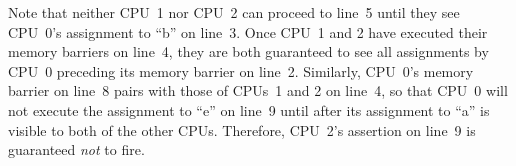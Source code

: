 \begin{table*}
\scriptsize
{}
\caption{Memory Barrier Example 3}
\label{tab:app:whymb:Memory Barrier Example 3}
\end{table*}

Note that neither CPU~1 nor CPU~2 can proceed to line~5 until they see
CPU~0's assignment to ``b'' on line~3.
Once CPU~1 and 2 have executed their memory barriers on line~4, they
are both guaranteed to see all assignments by CPU~0 preceding its memory
barrier on line~2.
Similarly, CPU~0's memory barrier on line~8 pairs with those of CPUs~1 and 2
on line~4, so that CPU~0 will not execute the assignment to ``e'' on
line~9 until after its assignment to ``a'' is visible to both of the
other CPUs.
Therefore, CPU~2's assertion on line~9 is guaranteed \emph{not} to fire.

